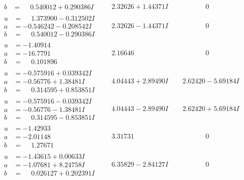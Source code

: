 \documentclass[1p]{elsarticle_modified}
\theoremstyle{definition}
\begin{document}
$$\begin{array}{c|c|c}
\begin{aligned}
b &= \phantom{-}0.540012 + 0.290386 I\end{aligned}
 & \phantom{-}2.32626 + 1.44371 I & \phantom{-0.000000 } 0 \\ \hline\begin{aligned}
u &= \phantom{-}1.373900 - 0.312502 I \\
a &= -0.546242 - 0.208542 I \\
b &= \phantom{-}0.540012 - 0.290386 I\end{aligned}
 & \phantom{-}2.32626 - 1.44371 I & \phantom{-0.000000 } 0 \\ \hline\begin{aligned}
u &= -1.40914\phantom{ +0.000000I} \\
a &= -16.7791\phantom{ +0.000000I} \\
b &= \phantom{-}0.101896\phantom{ +0.000000I}\end{aligned}
 & \phantom{-}2.16646\phantom{ +0.000000I} & \phantom{-0.000000 } 0 \\ \hline\begin{aligned}
u &= -0.575916 + 0.039342 I \\
a &= -0.56776 + 1.38481 I \\
b &= \phantom{-}0.314595 + 0.853851 I\end{aligned}
 & \phantom{-}4.04443 + 2.89490 I & \phantom{-}2.62420 - 5.69184 I \\ \hline\begin{aligned}
u &= -0.575916 - 0.039342 I \\
a &= -0.56776 - 1.38481 I \\
b &= \phantom{-}0.314595 - 0.853851 I\end{aligned}
 & \phantom{-}4.04443 - 2.89490 I & \phantom{-}2.62420 + 5.69184 I \\ \hline\begin{aligned}
u &= -1.42933\phantom{ +0.000000I} \\
a &= -2.01148\phantom{ +0.000000I} \\
b &= \phantom{-}1.27671\phantom{ +0.000000I}\end{aligned}
 & \phantom{-}3.31731\phantom{ +0.000000I} & \phantom{-0.000000 } 0 \\ \hline\begin{aligned}
u &= -1.43615 + 0.00633 I \\
a &= -1.07681 + 8.24758 I \\
b &= \phantom{-}0.026127 + 0.202391 I\end{aligned}
 & \phantom{-}6.35829 - 2.84127 I & \phantom{-0.000000 } 0 \\ \hline\begin{aligned}

\end{aligned}
\end{array}$$
\end{document}
